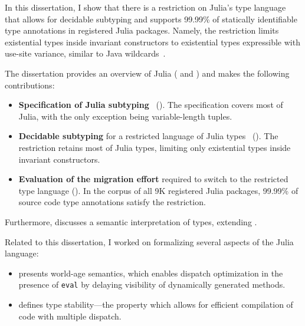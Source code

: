 In this dissertation, I show that there is
a restriction on Julia's type language that allows for decidable subtyping
and supports 99.99\% of statically identifiable type annotations
in registered Julia packages.
Namely, the restriction limits existential types inside invariant constructors
to existential types expressible with use-site variance,
similar to Java wildcards~\cite{bib:torgersen:wildcards:2004}.

The dissertation provides an overview of Julia
( and )
and makes the following contributions:
\begin{itemize}
  \item \textbf{Specification of Julia
    subtyping}~\citep*{bib:zappa-nardelli:julia-sub:oopsla:2018}
    ().
    The specification covers most of Julia, with the only exception being
    variable-length tuples.
  \item \textbf{Decidable subtyping} for a restricted language of Julia 
    types~\citep*{bib:belyakova:julia-sub-dec:draft} ().
    The restriction retains most of Julia types, limiting only existential types
    inside invariant constructors.
  \item \textbf{Evaluation of the migration effort} required to switch to 
    the restricted type language (). 
    In the corpus of all 9K registered Julia packages, 99.99\% of source code 
    type annotations satisfy the restriction.
\end{itemize}
Furthermore,  discusses a semantic interpretation
of types, extending \cite{bib:belyakova:minijl-sub:ftfjp:2019}.

Related to this dissertation, I worked on formalizing several aspects of the
Julia language:
\begin{itemize}
  \item \citep*{bib:belyakova:world-age:oopsla:2020} presents 
    world-age semantics, which enables dispatch optimization in the presence
    of \texttt{eval} by delaying visibility of dynamically generated methods.
  \item \citep*{bib:pelenitsyn:type-stability:oopsla:2021} defines type
    stability---the property which allows for efficient compilation of code with
    multiple dispatch.
\end{itemize}
